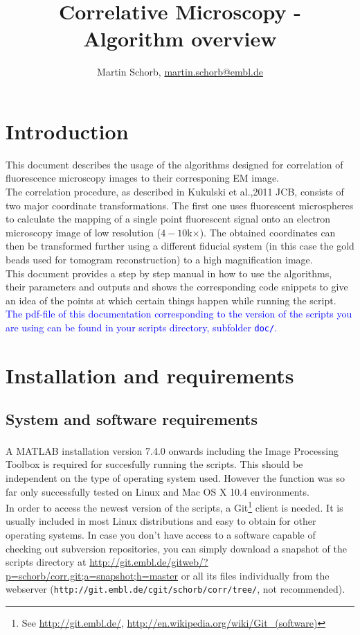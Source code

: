 \documentclass[10pt,a4paper,onepage,DIV12]{scrartcl}
\title{Correlative Microscopy - Algorithm overview}
\author{Martin Schorb, \href{mailto:martin.schorb@embl.de}{martin.schorb@embl.de}}
\begin{document}
\maketitle
\tableofcontents
 \newpage
\section{Introduction}
This document describes the usage of the algorithms designed for correlation of fluorescence microscopy images to their corresponing EM image.\\

The correlation procedure, as described in Kukulski et al.,2011 JCB, consists of two major coordinate transformations. The first one uses fluorescent microspheres to calculate the mapping of a single point fluorescent signal onto an electron microscopy image of low resolution ($4-10 $k$\times$). The obtained coordinates can then be transformed further using a different fiducial system (in this case the gold beads used for tomogram reconstruction) to a high magnification image.\\

This document provides a step by step manual in how to use the algorithms, their parameters and outputs and shows the corresponding code snippets to give an idea of the points at which certain things happen while running the script.\\

\textcolor{blue}{The pdf-file of this documentation corresponding to the version of the scripts you are using can be found in your scripts directory, subfolder \texttt{doc/}.}
\section{Installation and requirements}

\subsection{System and software requirements}A MATLAB\textsuperscript{\textregistered} 
installation version 7.4.0 onwards including the Image Processing Toolbox is required for succesfully running the scripts. This should be independent on the type of operating system used. However the function was so far only successfully tested on Linux and Mac OS X 10.4  environments. 
\\

In order to access the newest version of the scripts, a Git\footnote{See \url{http://git.embl.de/},\; \url{http://en.wikipedia.org/wiki/Git_(software)}} client is needed. It is usually included in most Linux distributions and easy to obtain for other operating systems. In case you don't have access to a software capable of checking out subversion repositories, you can simply download a snapshot of the scripts directory at \url{http://git.embl.de/gitweb/?p=schorb/corr.git;a=snapshot;h=master} or all its files individually from the webserver (\texttt{http://git.embl.de/cgit/schorb/corr/tree/}, not recommended).
\end{document}

